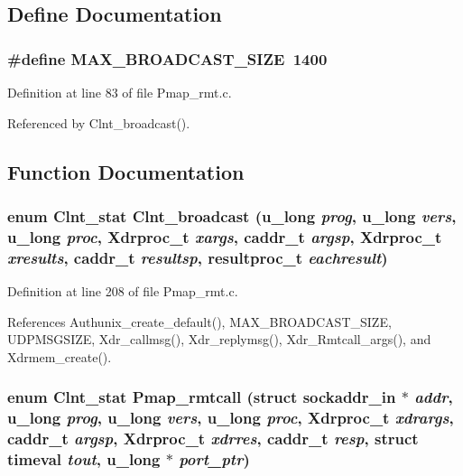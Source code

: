 \subsection{Define Documentation}
\subsubsection{\setlength{\rightskip}{0pt plus 5cm}\#define MAX\_\-BROADCAST\_\-SIZE\ 1400}\label{Pmap__rmt_8c_a0}




Definition at line 83 of file Pmap\_\-rmt.c.

Referenced by Clnt\_\-broadcast().

\subsection{Function Documentation}
\subsubsection{\setlength{\rightskip}{0pt plus 5cm}enum Clnt\_\-stat Clnt\_\-broadcast (u\_\-long {\em prog}, u\_\-long {\em vers}, u\_\-long {\em proc}, Xdrproc\_\-t {\em xargs}, caddr\_\-t {\em argsp}, Xdrproc\_\-t {\em xresults}, caddr\_\-t {\em resultsp}, resultproc\_\-t {\em eachresult})}\label{Pmap__rmt_8c_a6}




Definition at line 208 of file Pmap\_\-rmt.c.

References Authunix\_\-create\_\-default(), MAX\_\-BROADCAST\_\-SIZE, UDPMSGSIZE, Xdr\_\-callmsg(), Xdr\_\-replymsg(), Xdr\_\-Rmtcall\_\-args(), and Xdrmem\_\-create().
\subsubsection{\setlength{\rightskip}{0pt plus 5cm}enum Clnt\_\-stat Pmap\_\-rmtcall (struct sockaddr\_\-in $\ast$ {\em addr}, u\_\-long {\em prog}, u\_\-long {\em vers}, u\_\-long {\em proc}, Xdrproc\_\-t {\em xdrargs}, caddr\_\-t {\em argsp}, Xdrproc\_\-t {\em xdrres}, caddr\_\-t {\em resp}, struct timeval {\em tout}, u\_\-long $\ast$ {\em port\_\-ptr})}\label{Pmap__rmt_8c_a2}




